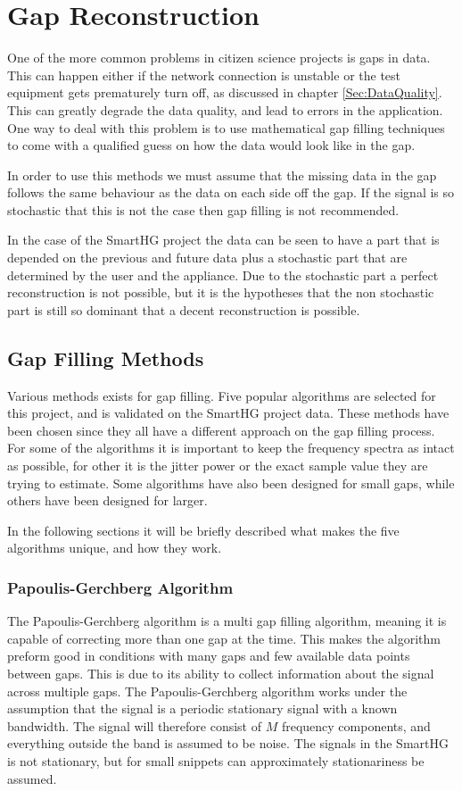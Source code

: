 \chapter{Gap Reconstruction}
\label{Sec:GapFill}
One of the more common problems in citizen science projects is gaps in data. This can happen either if the network connection is unstable or the test equipment gets prematurely turn off, as discussed in chapter \ref{Sec:DataQuality}. This can greatly degrade the data quality, and lead to errors in the application. One way to deal with this problem is to use mathematical gap filling techniques to come with a qualified guess on how the data would look like in the gap. 

In order to use this methods we must assume that the missing data in the gap follows the same behaviour as the data on each side off the gap. If the signal is so stochastic that this is not the case then gap filling is not recommended\citep{RefWorks:10}. 

In the case of the SmartHG project the data can be seen to have a part that is depended on the previous and future data plus a stochastic part that are determined by the user and the appliance. Due to the stochastic part a perfect reconstruction is not possible, but it is the hypotheses that the non stochastic part is still so dominant that a decent reconstruction is possible. 

\section{Gap Filling Methods}
\label{T:GapFilling}
Various methods exists for gap filling. Five popular algorithms are selected for this project, and is validated on the SmartHG project data. These methods have been chosen since they all have a different approach on the gap filling process. For some of the algorithms it is important to keep the frequency spectra as intact as possible, for other it is the jitter power or the exact sample value they are trying to estimate. Some algorithms have also been designed for small gaps, while others have been designed for larger. 

In the following sections it will be briefly described what makes the five algorithms unique, and how they work. 

\subsection{Papoulis-Gerchberg Algorithm}
\label{T:PGA}
The Papoulis-Gerchberg algorithm is a multi gap filling algorithm, meaning it is capable of correcting more than one gap at the time. This makes the algorithm preform good in conditions with many gaps and few available data points between gaps. This is due to its ability to collect information about the signal across multiple gaps\citep{RefWorks:11}. The Papoulis-Gerchberg algorithm works under the assumption that the signal is a periodic stationary signal with a known bandwidth. The signal will therefore consist of $M$ frequency components, and everything outside the band is assumed to be noise. The signals in the SmartHG is not stationary, but for small snippets can approximately stationariness be assumed. 


